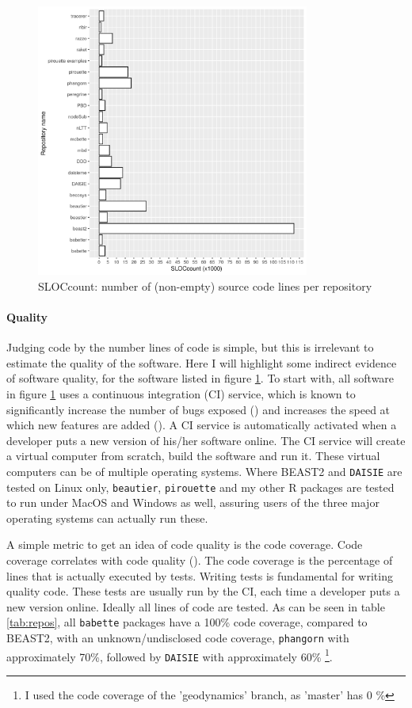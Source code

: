 \begin{figure}[]
  \includegraphics[width=0.8\textwidth]{sloccount.png}
  \caption{
    SLOCcount: number of (non-empty) source code lines per repository 
  }
  \label{fig:sloccount}
\end{figure}

\paragraph{Quality}

Judging code by the number lines of code is simple, but this is irrelevant 
to estimate the quality of the software.
Here I will highlight some indirect evidence of software quality,
for the software listed in figure \ref{fig:sloccount}.
To start with, all software in figure \ref{fig:sloccount} uses a
continuous integration (CI) service, which is known to significantly 
increase the number of bugs exposed (\cite{vasilescu2015}) and increases
the speed at which new features are added (\cite{vasilescu2015}).
A CI service is automatically activated when a developer puts a new version of
his/her software online. The CI service will create a virtual computer from
scratch, build the software and run it. These virtual computers can
be of multiple operating systems. 
Where BEAST2 and \verb;DAISIE; are tested on Linux only, \verb;beautier;,
\verb;pirouette; and my other R packages are tested to run under MacOS and
Windows as well, assuring users of the three major operating systems
can actually run these.

A simple metric to get an idea of code quality is the code coverage.
Code coverage correlates with code quality (\cite{horgan1994,del1995correlation}). 
The code coverage is the percentage of lines
that is actually executed by tests. 
Writing tests is fundamental for writing quality code.
These tests are usually run by the CI, each time a developer puts a new version
online. Ideally all lines of code are tested. 
As can be seen in table \ref{tab:repos}, all \verb;babette; packages
have a 100\% code coverage, compared to BEAST2, with an 
unknown/undisclosed code coverage, \verb;phangorn; with approximately
70\%, followed by \verb;DAISIE; with approximately 60\% 
\footnote{
  I used the code coverage of the 'geodynamics' branch, 
  as 'master' has 0 \%
}.

